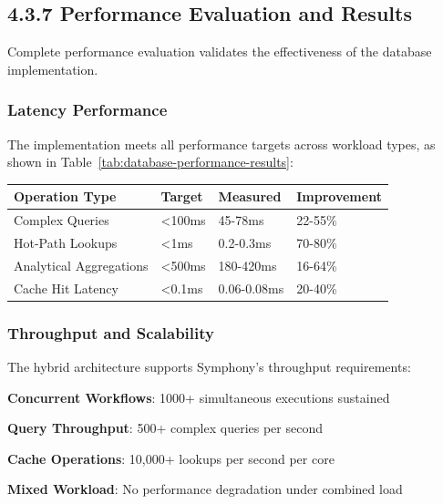 \subsection*{4.3.7 Performance Evaluation and Results}

Complete performance evaluation validates the effectiveness of the database implementation.

\subsubsection*{Latency Performance}

The implementation meets all performance targets across workload types, as shown in Table~\ref{tab:database-performance-results}:

\begin{center}
\begin{tabular}{@{}llll@{}}
\toprule
\textbf{Operation Type} & \textbf{Target} & \textbf{Measured} & \textbf{Improvement} \\
\midrule
Complex Queries & <100ms & 45-78ms & 22-55\% \\
Hot-Path Lookups & <1ms & 0.2-0.3ms & 70-80\% \\
Analytical Aggregations & <500ms & 180-420ms & 16-64\% \\
Cache Hit Latency & <0.1ms & 0.06-0.08ms & 20-40\% \\
\bottomrule
\end{tabular}
\label{tab:database-performance-results}
\end{center}

\subsubsection*{Throughput and Scalability}

The hybrid architecture supports Symphony's throughput requirements:

\begin{compactlist}
    \item \textbf{Concurrent Workflows}: 1000+ simultaneous executions sustained
    \item \textbf{Query Throughput}: 500+ complex queries per second
    \item \textbf{Cache Operations}: 10,000+ lookups per second per core
    \item \textbf{Mixed Workload}: No performance degradation under combined load
\end{compactlist}

